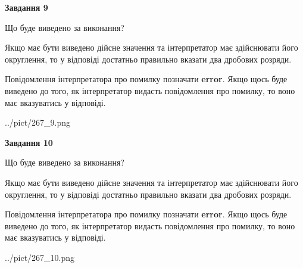 \documentclass[12pt, ukrainian]{article}
\begin{document}
{\begin {Large}
{\begin {center}\textbf{Завдання 9}\end {center}}\par
Що буде виведено за виконання? \par

Якщо має бути виведено дійсне значення та інтерпретатор має здійснювати його округлення, 
то у відповіді достатньо правильно вказати два дробових розряди.

Повідомлення інтерпретатора про помилку позначати \textbf{error}.
Якщо щось буде виведено до того, як інтерпретатор видасть повідомлення про помилку, 
то воно має вказуватись у відповіді. \par

\begin{center}
	{../pict/267_9.png}
\end{center}
\newpage

{\begin {center}\textbf{Завдання 10}\end {center}}\par
Що буде виведено за виконання? \par

Якщо має бути виведено дійсне значення та інтерпретатор має здійснювати його округлення, 
то у відповіді достатньо правильно вказати два дробових розряди.

Повідомлення інтерпретатора про помилку позначати \textbf{error}.
Якщо щось буде виведено до того, як інтерпретатор видасть повідомлення про помилку, 
то воно має вказуватись у відповіді. \par

\begin{center}
	{../pict/267_10.png}
\end{center}
\newpage

\end {Large}}
\end{document}
